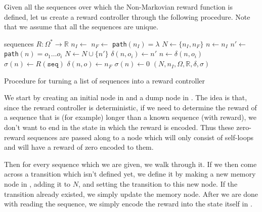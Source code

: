 Given all the sequences over which the Non-Markovian reward function is defined, let us create a reward controller through the following procedure. Note that we assume that all the sequences are unique.
\begin{algorithm}[H]
	\begin{algorithmic}[1]
		\Require sequences
		\Require $R : \Omega^* \to \mathbb{R}$
		\State $n_I \gets $   \label{l:initial_node}
		\State $n_F \gets $    \label{l:dump_node}
		\State \texttt{path}$(n_I)=\lambda$ \label{l:empty_path}
		\State $N\gets\{n_I,n_F\}$
			\State $n \gets n_I$
					\State $n'\gets$   \label{l:new_transition}
					\State \texttt{path}$(n)=o_1\dots o_i$
					\State $N \gets N \cup \{n'\}$		
					\State $\delta(n,o_i) \gets n'$	\label{l:set_transition}
				\EndIf 
				\State $n \gets \delta(n,o_i)$     
			\EndFor
			\State $\sigma(n) \gets R(\texttt{seq})$  \label{l:set_reward}
		\EndFor
		 
				 
					\State $\delta(n,o) \gets n_F$ \label{l:self_loop}
				\EndIf
			\EndFor
				\State $\sigma(n) \gets 0$ \label{l:set_zero}
			\EndIf
		\EndFor
		\State \Return $(N,n_I,\Omega,\mathbb{R},\delta,\sigma)$
		\EndProcedure
	\end{algorithmic}
	\caption{Procedure for turning a list of sequences into a reward controller}
	\label{procedure:into_reward_controller}
\end{algorithm}

We start by creating an initial node in  and a dump node in . The idea is that, since the reward controller is deterministic, if we need to determine the reward of a sequence that is (for example) longer than a known sequence (with reward), we don't want to end in the state in which the reward is encoded. Thus these zero-reward sequences are passed along to a node which will only consist of self-loops and will have a reward of zero encoded to them.

Then for every sequence which we are given, we walk through it. If we then come across a transition which isn't defined yet, we define it by making a new memory node in , adding it to $N$, and setting the transition to this new node. If the transition already existed, we simply update the memory node. After we are done with reading the sequence, we simply encode the reward into the state itself in .

